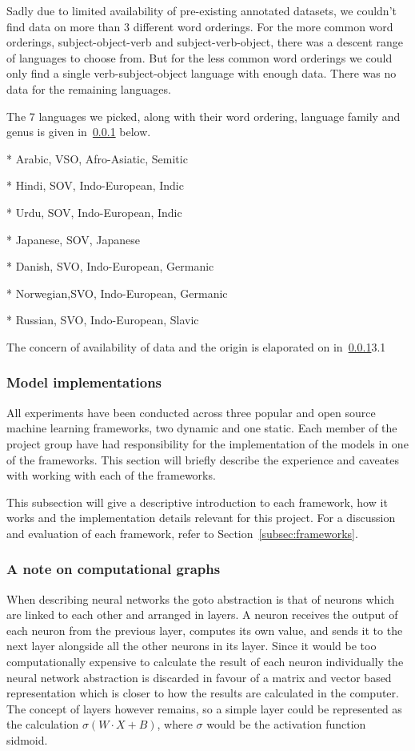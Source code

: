 Sadly due to limited availability of pre-existing annotated datasets, we
couldn't find data on more than 3 different word orderings. For the more common
word orderings, subject-object-verb and subject-verb-object, there was a descent
range of languages to choose from. But for the less common word orderings we
could only find a single verb-subject-object language with enough data. There
was no data for the remaining languages. 

The 7 languages we picked, along with their word ordering, language family and
genus is given in~\ref{} below.

* Arabic,   VSO, Afro-Asiatic, Semitic 

* Hindi,    SOV, Indo-European, Indic

* Urdu,     SOV, Indo-European, Indic

* Japanese, SOV, Japanese

* Danish,   SVO, Indo-European, Germanic

* Norwegian,SVO, Indo-European, Germanic

* Russian,  SVO, Indo-European, Slavic

The concern of availability of data and the origin is elaporated on
in~\ref{}{3.1}


\subsubsection{Model implementations}

All experiments have been conducted across three popular and open source machine
learning frameworks, two dynamic and one static. Each member of the project
group have had responsibility for the implementation of the models in one of the
frameworks. This section will briefly describe the experience and caveates with
working with each of the frameworks.

This subsection will give a descriptive introduction to each framework, how it
works and the implementation details relevant for this project. For a discussion
and evaluation of each framework, refer to Section~\ref{subsec:frameworks}.

\subsubsection*{A note on computational graphs}

When describing neural networks the goto abstraction is that of neurons which
are linked to each other and arranged in layers. A neuron receives the output of
each neuron from the previous layer, computes its own value, and sends it to the
next layer alongside all the other neurons in its layer. Since it would be too
computationally expensive to calculate the result of each neuron individually
the neural network abstraction is discarded in favour of a matrix and vector
based representation which is closer to how the results are calculated in the
computer. The concept of layers however remains, so a simple layer could be
represented as the calculation $\sigma(W \cdot X + B)$, where $\sigma$ would be
the activation function sidmoid. 

